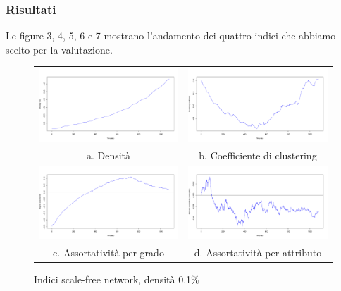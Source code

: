 \documentclass[a4paper,12pt]{article}
\begin{document}
\subsubsection{Risultati}
Le figure 3, 4, 5, 6 e 7 mostrano l'andamento dei quattro indici che abbiamo scelto per la valutazione.
\begin{figure}[h]
\begin{tabular}{cc}
  \includegraphics[width=83mm]{images/evolution_1000_sf_1080_0.pdf} &   \includegraphics[width=83mm]{images/clustering_1000_sf_1080_0.pdf} \\
a. Densità & b. Coefficiente di clustering \\[6pt]
 \includegraphics[width=83mm]{images/deg_assortativity_1000_sf_1080_0.pdf} &   \includegraphics[width=83mm]{images/homophily_1000_sf_1080_0.pdf} \\
c. Assortatività per grado & d. Assortatività per attributo \\[6pt]
\end{tabular}
\caption{Indici scale-free network, densità 0.1\%}
\end{figure}
\end{document}
